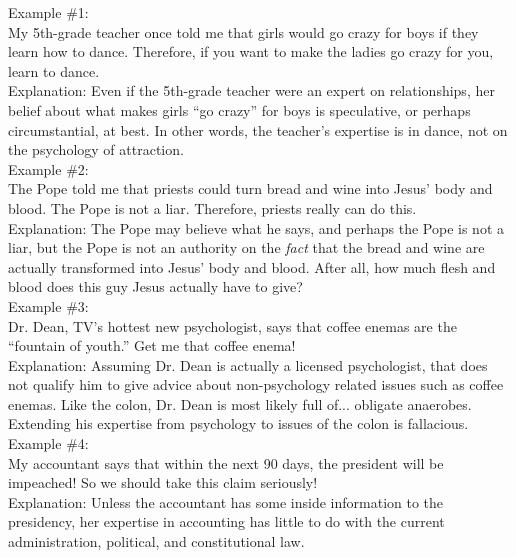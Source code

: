 \documentclass[a4paper,12pt,single,pdftex]{scrbook}
\begin{document}
    
      Example \#1:
    \\

    
      My 5th-grade teacher once told me that girls would go crazy for boys if they learn how to dance.  Therefore, if you want to make the ladies go crazy for you, learn to dance.
    \\

    
      Explanation: Even if the 5th-grade teacher were an expert on relationships, her belief about what makes girls “go crazy” for boys is speculative, or perhaps circumstantial, at best. In other words, the teacher's expertise is in dance, not on the psychology of attraction.
    \\

    
      Example \#2:
    \\

    
      The Pope told me that priests could turn bread and wine into Jesus’ body and blood.  The Pope is not a liar. Therefore, priests really can do this.
    \\

    
      Explanation: The Pope may believe what he says, and perhaps the Pope is not a liar, but the Pope is not an authority on the {\it fact}  that the bread and wine are actually transformed into Jesus’ body and blood. After all, how much flesh and blood does this guy Jesus actually have to give? 
    \\

    
      Example \#3:
    \\

    
      Dr. Dean, TV’s hottest new psychologist, says that coffee enemas are the “fountain of youth.” Get me that coffee enema!
    \\

    
      Explanation: Assuming Dr. Dean is actually a licensed psychologist, that does not qualify him to give advice about non-psychology related issues such as coffee enemas. Like the colon, Dr. Dean is most likely full of... obligate anaerobes. Extending his expertise from psychology to issues of the colon is fallacious.
    \\

    
      Example \#4:
    \\

    
      My accountant says that within the next 90 days, the president will be impeached! So we should take this claim seriously!
    \\

    
      Explanation: Unless the accountant has some inside information to the presidency, her expertise in accounting has little to do with the current administration, political, and constitutional law.
    \\
\end{document}
